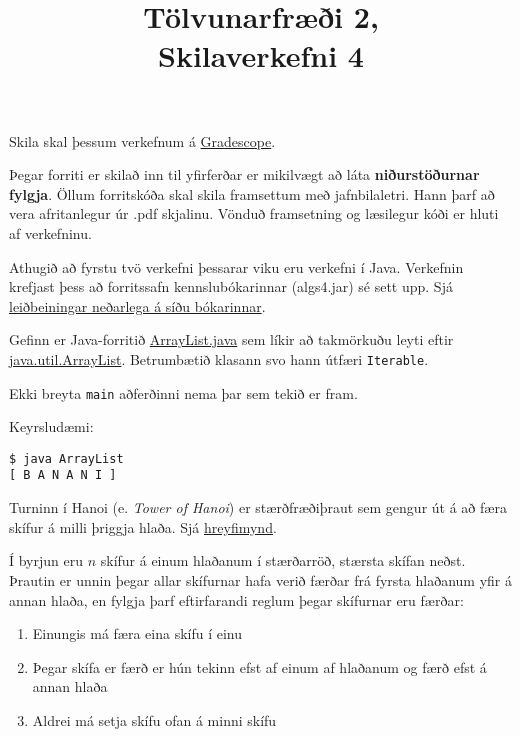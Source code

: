 \documentclass{article}
\title{Tölvunarfræði 2, \semester \\ Skilaverkefni 4}
\author{}
\begin{document}
\maketitle
{}

Skila skal þessum verkefnum á \href{https://gradescope.com/courses/14122}{Gradescope}.

Þegar forriti er skilað inn til yfirferðar er mikilvægt að láta \textbf{niðurstöðurnar fylgja}. Öllum forritskóða skal skila framsettum með jafnbilaletri. Hann þarf að vera afritanlegur úr .pdf skjalinu. Vönduð framsetning og læsilegur kóði er hluti af verkefninu.

Athugið að fyrstu tvö verkefni þessarar viku eru verkefni í Java. Verkefnin krefjast þess að forritssafn kennslubókarinnar (algs4.jar) sé sett upp. Sjá \href{http://algs4.cs.princeton.edu/code/}{leiðbeiningar neðarlega á síðu bókarinnar}.

\question

Gefinn er Java-forritið \href{https://raw.githubusercontent.com/Ernir/kennsluefni/master/T2/Code/w5/ArrayList.java}{ArrayList.java} sem líkir að takmörkuðu leyti eftir \href{https://docs.oracle.com/javase/8/docs/api/java/util/ArrayList.html}{java.util.ArrayList}.  Betrumbætið klasann svo hann útfæri \texttt{Iterable}.

Ekki breyta \texttt{main} aðferðinni nema þar sem tekið er fram.

Keyrsludæmi:

\begin{verbatim}
$ java ArrayList
[ B A N A N I ]
\end{verbatim}

\question
Turninn í Hanoi (e. \emph{Tower of Hanoi}) er stærðfræðiþraut sem gengur út á að færa skífur á milli þriggja hlaða. Sjá \href{https://www.tutorialspoint.com/data_structures_algorithms/images/tower_of_hanoi.gif}{hreyfimynd}.

Í byrjun eru $n$ skífur á einum hlaðanum í stærðarröð, stærsta skífan neðst. Þrautin er unnin þegar allar skífurnar hafa verið færðar frá fyrsta hlaðanum yfir á annan hlaða, en fylgja þarf eftirfarandi reglum þegar skífurnar eru færðar:
\begin{enumerate}
	\item Einungis má færa eina skífu í einu
	\item Þegar skífa er færð er hún tekinn efst af einum af hlaðanum og færð efst á annan hlaða
	\item Aldrei má setja skífu ofan á minni skífu
\end{enumerate}
\end{document}
